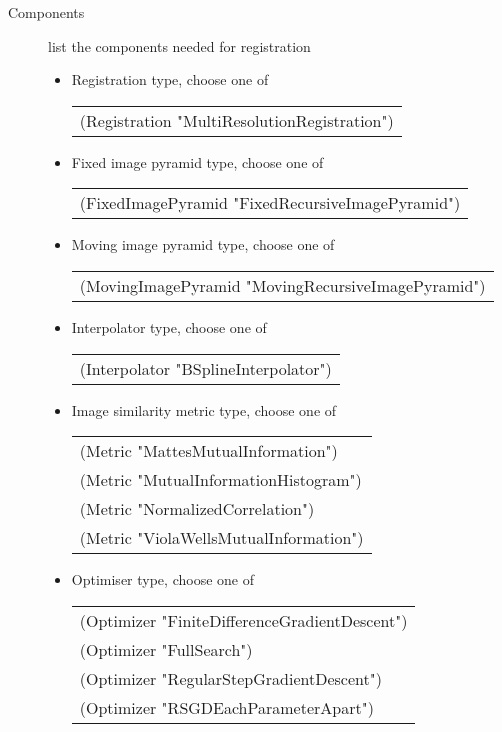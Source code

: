 \documentclass[a4paper]{article}
\newenvironment{Tabular}[1]{\ttfamily \begin{tabular}{#1}}{\end{tabular}}
\begin{document}
\begin{description}
\item[Components] list the components needed for registration\\\vspace{-5mm}
    \begin{itemize}
    \item Registration type, choose one of\\
        \begin{Tabular}{l}
        (Registration "MultiResolutionRegistration")
        \end{Tabular}
    \item Fixed image pyramid type, choose one of\\
        \begin{Tabular}{l}
        (FixedImagePyramid "FixedRecursiveImagePyramid")
        \end{Tabular}
    \item Moving image pyramid type, choose one of\\
        \begin{Tabular}{l}
        (MovingImagePyramid "MovingRecursiveImagePyramid")
        \end{Tabular}
    \item Interpolator type, choose one of\\
        \begin{Tabular}{l}
        (Interpolator "BSplineInterpolator")
        \end{Tabular}
    \item Image similarity metric type, choose one of\\
        \begin{Tabular}{l}
        (Metric "MattesMutualInformation") \\
        (Metric "MutualInformationHistogram") \\
        (Metric "NormalizedCorrelation") \\
        (Metric "ViolaWellsMutualInformation")
        \end{Tabular}
    \item Optimiser type, choose one of\\
        \begin{Tabular}{l}
        (Optimizer "FiniteDifferenceGradientDescent") \\
        (Optimizer "FullSearch") \\
        (Optimizer "RegularStepGradientDescent") \\
        (Optimizer "RSGDEachParameterApart") \\

\end{Tabular}
\end{itemize}
\end{description}
\end{document}
